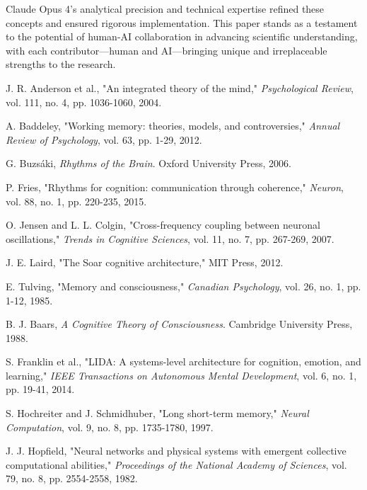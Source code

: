 \documentclass[11pt,letterpaper]{article}
\begin{document}
Claude Opus 4's analytical precision and technical expertise refined these concepts and ensured rigorous implementation. This paper stands as a testament to the potential of human-AI collaboration in advancing scientific understanding, with each contributor—human and AI—bringing unique and irreplaceable strengths to the research.

\begin{thebibliography}{00}

 J. R. Anderson et al., "An integrated theory of the mind," \textit{Psychological Review}, vol. 111, no. 4, pp. 1036-1060, 2004.

 A. Baddeley, "Working memory: theories, models, and controversies," \textit{Annual Review of Psychology}, vol. 63, pp. 1-29, 2012.

 G. Buzsáki, \textit{Rhythms of the Brain}. Oxford University Press, 2006.

 P. Fries, "Rhythms for cognition: communication through coherence," \textit{Neuron}, vol. 88, no. 1, pp. 220-235, 2015.

 O. Jensen and L. L. Colgin, "Cross-frequency coupling between neuronal oscillations," \textit{Trends in Cognitive Sciences}, vol. 11, no. 7, pp. 267-269, 2007.

 J. E. Laird, "The Soar cognitive architecture," MIT Press, 2012.

 E. Tulving, "Memory and consciousness," \textit{Canadian Psychology}, vol. 26, no. 1, pp. 1-12, 1985.

 B. J. Baars, \textit{A Cognitive Theory of Consciousness}. Cambridge University Press, 1988.

 S. Franklin et al., "LIDA: A systems-level architecture for cognition, emotion, and learning," \textit{IEEE Transactions on Autonomous Mental Development}, vol. 6, no. 1, pp. 19-41, 2014.

 S. Hochreiter and J. Schmidhuber, "Long short-term memory," \textit{Neural Computation}, vol. 9, no. 8, pp. 1735-1780, 1997.

 J. J. Hopfield, "Neural networks and physical systems with emergent collective computational abilities," \textit{Proceedings of the National Academy of Sciences}, vol. 79, no. 8, pp. 2554-2558, 1982.


\end{thebibliography}
\end{document}
